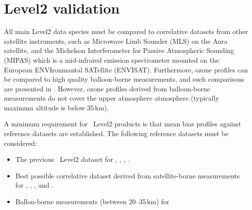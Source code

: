 \section{Level2 validation}

All main Level2 data species must be compared to correlative datasets
from other satellite instruments, such as Microwave Limb Sounder (MLS)
on the Aura satellite, and the Michelson Interferometer for Passive
Atmospheric Sounding (MIPAS) which is a mid-infrared emission spectrometer
mounted on the European ENVIronmantal SATellite (ENVISAT).
Furthermore, \smr ozone profiles can be compared to high quality balloon-borne 
measurements, and such comparisons are presented in \citep{jegou:techn:08}.
However, ozone profiles derived from balloon-borne 
measurements do not cover the upper atmosphere atmosphere (typically maximum
altitude is below 35\,km).

A minimum requirement for \smr\ Level2 products is that mean bias 
profiles against reference datasets are established. 
The following reference datasets must be considered:
\begin{itemize}

\item The previous \smr\ Level2 dataset for , , , .

\item Best possible correlative dataset derived from satellite-borne measurements
      for , , , and .

\item Ballon-borne measurements (between 20--35\,km) for 

\end{itemize}



 
